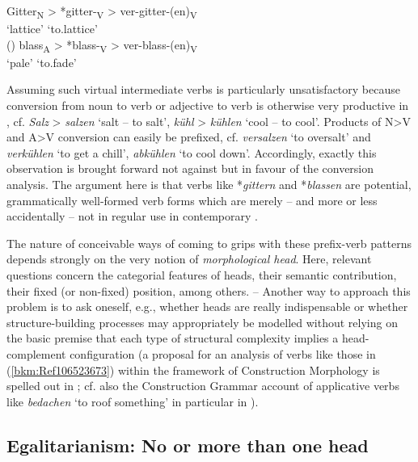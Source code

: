\documentclass[output=paper
  ,nobabel
  ,draftmode
  ,colorlinks, citecolor=brown
]{langscibook}
\begin{document}
\eal
\ex
\gll Gitter\textsubscript{N}    >    *gitter-\textsubscript{V}    >   ver-gitter-(en)\textsubscript{V}\\
     `lattice'                 {}    {}                           {}  `to.lattice'\\\hfill()
\ex
\gll blass\textsubscript{A}    >     *blass-\textsubscript{V}   >    ver-blass-(en)\textsubscript{V}\\
       `pale'                  {}    {}                         {}   `to.fade' \\
\zl

\noindent
Assuming such virtual intermediate verbs is particularly unsatisfactory because conversion from noun
to verb or adjective to verb is otherwise very productive in , cf. \emph{Salz} > \emph{salzen}
`salt – to salt', \emph{kühl} > \emph{kühlen} `cool – to cool'. Products of N>V and A>V conversion
can easily be prefixed, cf. \emph{versalzen} `to oversalt' and \emph{verkühlen} `to get a chill',
\emph{abkühlen} `to cool down'. Accordingly, exactly this observation is brought forward not against
but in favour of the conversion analysis. The argument here is that verbs like *\emph{gittern} and
*\emph{blassen} are potential, grammatically well-formed verb forms which are merely – and more or
less accidentally – not in regular use in contemporary .

The nature of conceivable ways of coming to grips with these prefix-verb patterns depends strongly
on the very notion of \emph{morphological head}. Here, relevant questions concern the categorial
features of heads, their semantic contribution, their fixed (or non-fixed) position, among others. –
Another way to approach this problem is to ask oneself, e.g., whether heads are really indispensable
or whether structure-building processes may appropriately be modelled without relying on the basic
premise that each type of structural complexity implies a head-complement configuration (a proposal
for an analysis of verbs like those in (\ref{bkm:Ref106523673}) within the framework of Construction
Morphology is spelled out in \citealt{Michel2014}; cf. also the Construction Grammar account of
applicative verbs like \emph{bedachen} `to roof something' in particular in
\citealt{MichaelisRuppenhofer2001}).

\subsection{Egalitarianism: No or more than one head}
\end{document}
